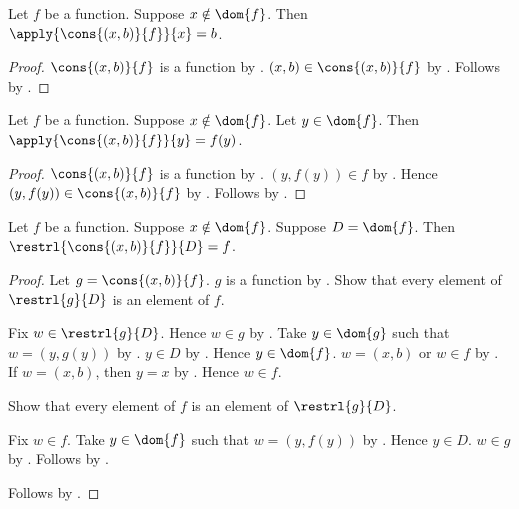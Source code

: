 \begin{proposition}\label{extend_set_function_at_new_point_new_value}
    Let $f$ be a function.
    Suppose $x\notin\dom{f}$.
    Then $\apply{\cons{(x,b)}{f}}{x}=b$.
\end{proposition}
\begin{proof}
    $\cons{(x,b)}{f}$ is a function by
        .
    $(x,b)\in\cons{(x,b)}{f}$ by .
    Follows by .
\end{proof}

\begin{proposition}\label{extend_set_function_at_new_point_old_value}
    Let $f$ be a function.
    Suppose $x\notin\dom{f}$.
    Let $y\in\dom{f}$.
    Then $\apply{\cons{(x,b)}{f}}{y}=f(y)$.
\end{proposition}
\begin{proof}
    $\cons{(x,b)}{f}$ is a function by
        .
    $(y,f(y))\in f$ by .
    Hence $(y,f(y))\in\cons{(x,b)}{f}$ by .
    Follows by .
\end{proof}

\begin{proposition}\label{extend_set_function_at_new_point_restriction_at}
    Let $f$ be a function.
    Suppose $x\notin\dom{f}$.
    Suppose $D=\dom{f}$.
    Then $\restrl{\cons{(x,b)}{f}}{D}=f$.
\end{proposition}
\begin{proof}
    Let $g=\cons{(x,b)}{f}$.
    $g$ is a function by
        .
    Show that every element of $\restrl{g}{D}$ is an element of $f$.
    \begin{subproof}
        Fix $w\in\restrl{g}{D}$.
        Hence $w\in g$ by .
        Take $y\in\dom{g}$ such that $w=(y,g(y))$ by
            .
        $y\in D$ by .
        Hence $y\in\dom{f}$.
        $w=(x,b)$ or $w\in f$ by .
        If $w=(x,b)$, then $y=x$ by .
        Hence $w\in f$.
    \end{subproof}
    Show that every element of $f$ is an element of
        $\restrl{g}{D}$.
    \begin{subproof}
        Fix $w\in f$.
        Take $y\in\dom{f}$ such that $w=(y,f(y))$ by
            .
        Hence $y\in D$.
        $w\in g$ by .
        Follows by .
    \end{subproof}
    Follows by .
\end{proof}

